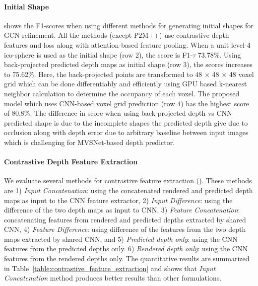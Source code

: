 \paragraph{Initial Shape}\vspace{-4mm}
 shows the F1-scores when using different methods for generating initial shapes for GCN refinement.
All the methods (except P2M++) use contrastive depth features and loss along with attention-based feature pooling.
When a unit level-4 ico-sphere is used as the initial shape (row 2), the score is F1-$\tau$ 73.78\%.
Using back-projected predicted depth maps as initial shape (row 3), the scores increases to 75.62\%.
Here, the back-projected points are transformed to 48 $\times$ 48 $\times$ 48 voxel grid
which can be done differentiably and efficiently using GPU based k-nearest neighbor calculation to determine the occupancy of each voxel.
The proposed model which uses CNN-based voxel grid prediction (row 4) has the highest score of 80.8\%.
The difference in score when using back-projected depth vs CNN predicted shape is due to the incomplete shapes the predicted depth give due to occlusion along with depth error due to arbitrary baseline between input images which is challenging for MVSNet-based depth predictor.

\paragraph{Contrastive Depth Feature Extraction}\vspace{-4mm}
We evaluate several methods for contrastive feature extraction (). These methods are
1) \emph{Input Concatenation}: using the concatenated rendered and predicted depth maps as input to the CNN feature extractor,
2) \emph{Input Difference}: using the difference of the two depth maps as input to CNN,
3) \emph{Feature Concatenation}: concatenating features from rendered and predicted depths extracted by shared CNN,
4) \emph{Feature Difference}: using difference of the features from the two depth maps extracted by shared CNN, and
5) \emph{Predicted depth only}: using the CNN features from the predicted depths only.
6) \emph{Rendered depth only}: using the CNN features from the rendered depths only.
The quantitative results are summarized in Table~\ref{table:contrastive_feature_extraction} and shows that \emph{Input Concatenation} method produces better results than other formulations.

